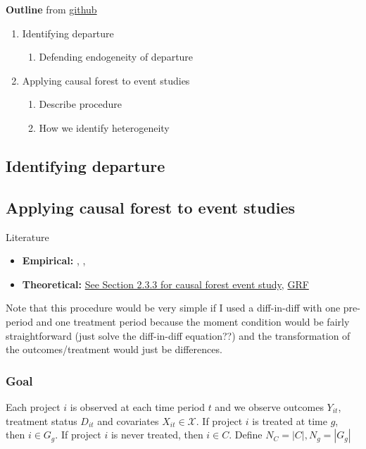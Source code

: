 \documentclass[source/paper/main.tex]{subfiles}
\begin{document}
\textbf{Outline} from \href{https://github.com/liaochris/oss_hierarchy/issues/2#issuecomment-2589020215}{github}
\begin{enumerate}
    \item Identifying departure
        \begin{enumerate}
            \item Defending endogeneity of departure
        \end{enumerate}
    \item Applying causal forest to event studies
    \begin{enumerate}
        \item Describe procedure
        \item How we identify heterogeneity
    \end{enumerate}
\end{enumerate}

\subsection{Identifying departure}

\subsection{Applying causal forest to event studies}
Literature
\begin{itemize}
    \item \textbf{Empirical: } \cite{iyengar_impact_2022}, \cite{cui_tax-induced_2022}, \cite{guo_effect_2021}
    \item \textbf{Theoretical:} \href{https://pure.au.dk/ws/portalfiles/portal/198663023/Nicolaj_Mu_hlbach_PhD_dissertation.pdf}{See Section 2.3.3 for causal forest event study}, \href{https://arxiv.org/pdf/1610.01271}{GRF}
\end{itemize}

Note that this procedure would be very simple if I used a diff-in-diff with one pre-period and one treatment period because the moment condition would be fairly straightforward (just solve the diff-in-diff equation??) and the transformation of the outcomes/treatment would just be differences. 

\subsubsection{Goal}
Each project $i$ is observed at each time period $t$ and we observe outcomes $Y_{it}$, treatment status $D_{it}$ and covariates $X_{it} \in \mathcal{X}$. If project $i$ is treated at time $g$, then $i \in G_g$. If project $i$ is never treated, then $i \in C$. Define $N_C = |C|, N_g = |G_g|$
\end{document}
